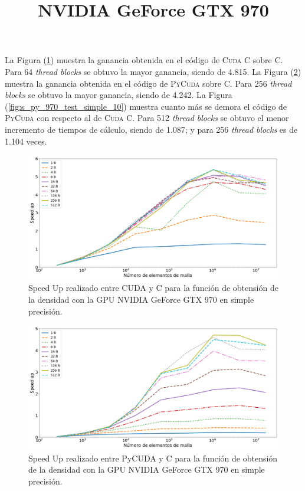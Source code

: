%
\title{\textbf{NVIDIA GeForce GTX 970}}

La Figura (\ref{fig:s_cuda_970_test_simple_10}) muestra la ganancia obtenida en el código de \textsc{Cuda C} sobre \textsc{C}. Para 64 \textit{thread blocks} se obtuvo la mayor ganancia, siendo de 4.815. La Figura (\ref{fig:s_py_c_970_test_simple_10}) muestra la ganancia obtenida en el código de \textsc{PyCuda} sobre \textsc{C}. Para 256 \textit{thread blocks} se obtuvo la mayor ganancia, siendo de 4.242. La Figura (\ref{fig:s_py_970_test_simple_10}) muestra cuanto más se demora el código de \textsc{PyCuda} con respecto al de \textsc{Cuda C}. Para 512  \textit{thread blocks} se obtuvo el menor incremento de tiempos de cálculo, siendo de 1.087; y para 256 \textit{thread blocks} es de 1.104 veces.

\begin{figure}[htbp]
	\centering
	\includegraphics[width=\textwidth]{figs/cap4/s_cuda_970_test_simple_10}
	\caption{Speed Up realizado entre CUDA y C para la función de obtensión de la densidad con la GPU NVIDIA GeForce GTX 970 en simple precisión.} 
	\label{fig:s_cuda_970_test_simple_10}	
\end{figure}

\begin{figure}[htbp]
	\centering
	\includegraphics[width=\textwidth]{figs/cap4/s_py_c_970_test_simple_10}
	\caption{Speed Up realizado entre PyCUDA y C para la función de obtensión de la densidad con la GPU NVIDIA GeForce GTX 970 en simple precisión.} 
	\label{fig:s_py_c_970_test_simple_10}	
\end{figure}

